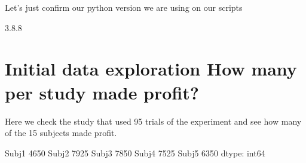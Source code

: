 \documentclass[letterpaper,10pt,english]{jupyterBook}
\begin{document}
\sphinxAtStartPar
Let’s just confirm our python version we are using on our scripts

\begin{sphinxVerbatim}[commandchars=\\\{\}]
   
\end{sphinxVerbatim}

\begin{sphinxVerbatim}[commandchars=\\\{\}]
3.8.8
\end{sphinxVerbatim}


\chapter{Initial data exploration \sphinxhyphen{} How many per study made profit?}
\label{\detokenize{data-analysis:initial-data-exploration-how-many-per-study-made-profit}}
\sphinxAtStartPar
Here we check the study that used 95 trials of the experiment and see how many of the 15 subjects made profit.

\begin{sphinxVerbatim}[commandchars=\\\{\}]
  
  
  
\end{sphinxVerbatim}

\begin{sphinxVerbatim}[commandchars=\\\{\}]
Subj\PYGZus{}1   \PYGZhy{}4650
Subj\PYGZus{}2   \PYGZhy{}7925
Subj\PYGZus{}3   \PYGZhy{}7850
Subj\PYGZus{}4   \PYGZhy{}7525
Subj\PYGZus{}5   \PYGZhy{}6350
dtype: int64
\end{sphinxVerbatim}

\begin{sphinxVerbatim}[commandchars=\\\{\}]
  
\end{sphinxVerbatim}
\end{document}
